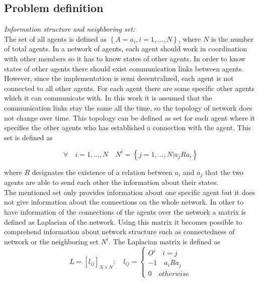 \documentclass[conference]{IEEEtran}
\begin{document}
\subsection{Problem definition}
\textit{Information structure and neighboring set:}\\
The set of all agents is defined as $ \left\{ A=a_{i}, i=1,...,N\right\} $, where $N$ is the number of total agents. In a network of agents, each agent should work in coordination with other members so it has to know states of other agents. In order to know states of other agents there should exist communication links between agents. However, since the implementation is semi decentralized, each agent is not connected to all other agents. For each agent there are some specific other agents which it can communicate with. In this work it is assumed that the communication links stay the same all the time, so the topology of network does not change over time. This topology can be defined as set for each agent where it specifies the other agents who has established a connection with the agent. This set is defined as

\begin{equation}\label{eq:setOfNeighbors}
\forall \quad i=1,...,N \quad  N^{i}=\left\{j=1,...,N|a_{j}Ra_{i}\right\}
\end{equation}

where $R$ designates the existence of a relation between $a_{i}$ and $a_{j}$ that the two agents are able to send each other the information about their states.\\

The mentioned set only provides information about one specific agent but it does not give information about the connections on the whole network. In other to have information of the connections of the agents over the network a matrix is defined as Laplacian of the network. Using this matrix it becomes possible to comprehend information about network structure such as connectedness of network or the neighboring set $N^{i}$. The Laplacian matrix is defined as 
\begin{equation}\label{eq:laplacian}
L=[l_{ij}]_{N\times N}; \quad l_{ij}=
  \begin{cases}
  O^{i} \quad i=j\\
  -1 \quad a_{i}Ra_{j}\\
  0 \quad otherwise 
  \end{cases}
\end{equation}
\end{document}
